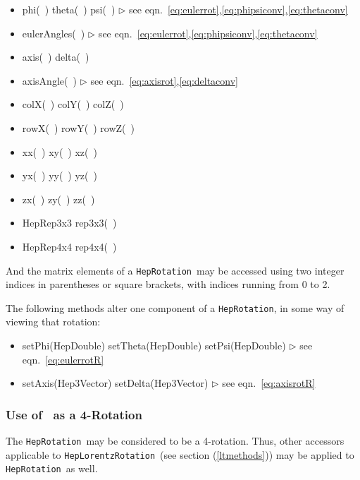 \documentclass[twoside,12pt]{article}
\def \Ro {{\tt HepRotation}}
\def \LT {{\tt HepLorentzRotation}}
\newcommand {\see}[1] {\hfill$\triangleright$ see eqn.~#1}
\newenvironment{shortlist}{%
\begin{itemize}
\setlength{\itemsep}{0pt}
\setlength{\parskip}{0pt}
}{%
\end{itemize}
}
\begin{document}
\begin{shortlist}
  \item phi(~) \/\/\/ theta(~) \/\/\/ psi(~) 
		\see{\ref{eq:eulerrot},\ref{eq:phipsiconv},\ref{eq:thetaconv}}
  \item eulerAngles(~) 	
		\see{\ref{eq:eulerrot},\ref{eq:phipsiconv},\ref{eq:thetaconv}}
  \item axis(~)	\/\/\/ delta(~)
  \item axisAngle(~) 		\see{\ref{eq:axisrot},\ref{eq:deltaconv}}
  \item colX(~) \/\/\/ colY(~) \/\/\/ colZ(~) 
  \item rowX(~) \/\/\/ rowY(~) \/\/\/ rowZ(~) 
  \item xx(~) \/\/\/ xy(~) \/\/\/ xz(~) 
  \item yx(~) \/\/\/ yy(~) \/\/\/ yz(~) 
  \item zx(~) \/\/\/ zy(~) \/\/\/ zz(~) 

  \item HepRep3x3 rep3x3(~) 	

  \item HepRep4x4 rep4x4(~) 

\end{shortlist}

And the matrix elements of a \Ro\ may be accessed using two integer indices
in parentheses or square brackets, with indices running from 0 to 2.

The following methods alter one component of a \Ro, in some way of viewing 
that rotation:

\begin{shortlist}
  \item setPhi(HepDouble) \/\/\/ setTheta(HepDouble) \/\/\/ setPsi(HepDouble) 
		\see{\ref{eq:eulerrotR}}
  \item setAxis(Hep3Vector)	\/\/\/ setDelta(Hep3Vector)
		\see{\ref{eq:axisrotR}}
\end{shortlist}


\subsubsection{Use of \protect\Ro\ as a 4-Rotation}

The \Ro\ may be considered to be a 4-rotation.  Thus, other accessors 
applicable to \LT\ (see section (\ref{ltmethods}))
may be applied to \Ro\ as well.
\end{document}
